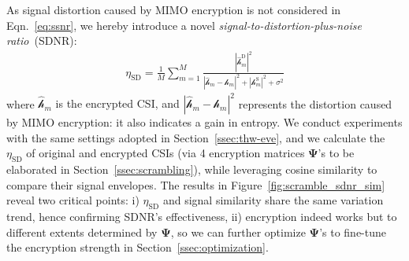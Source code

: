 \documentclass[conference,compsoc]{IEEEtran}
\newcommand{\rev}[1]{{\color{blue}#1}}      %
\newcommand{\newrev}[1]{{\color{blue}#1}}    %
\newcommand{\rev}[1]{#1}
\newcommand{\newrev}[1]{#1}
\begin{document}
As \newrev{signal distortion caused by MIMO encryption is} not considered in Eqn.~\eqref{eq:ssnr}, we hereby introduce a novel \textit{signal-to-distortion-plus-noise ratio}~(SDNR): 
%
\begin{align} \label{eq:sdnr}
	\eta_{\mathrm{SD}} = \frac{1}{M} {\textstyle{\sum_{m = 1}^{M}}} \frac{| \hat{\mathcal{h}}^{\mathrm{D}}_{m}|^2}{| \hat{\mathcal{h}}^{\mathrm{}}_{m}  -    \mathcal{h}_{m}^{\mathrm{}}|^2 +| 
    \mathcal{h}_{m}^{\mathrm{S}}|^2 + \sigma^2}
\end{align}
%
%
where 
\rev{$ \hat{ \mathcal{h} }_{m} $ is the encrypted CSI,
and $| \hat{\mathcal{h}}^{\mathrm{}}_{m}  -    \mathcal{h}_{m}^{\mathrm{}}|^2$ }
represents the distortion caused by \newrev{MIMO encryption:
%
it also indicates a gain in entropy.} 
We conduct experiments with the same settings adopted in Section~\ref{ssec:thw-eve}, and we calculate the $\eta_{\mathrm{SD}}$ of original and encrypted CSIs (via 4 encryption matrices $\bm{\Psi}$'s to be elaborated in Section~\ref{ssec:scrambling}), while leveraging cosine similarity to compare their signal envelopes. The results in Figure~\ref{fig:scramble_sdnr_sim} reveal two critical points: i) $\eta_{\text{SD}}$ and signal similarity share the same variation trend, hence confirming SDNR's effectiveness, ii) encryption indeed works but to different extents determined by $\bm{\Psi}$, so we can further optimize $\bm{\Psi}$'s to \newrev{fine-tune the encryption strength} in Section~\ref{ssec:optimization}.
\end{document}
